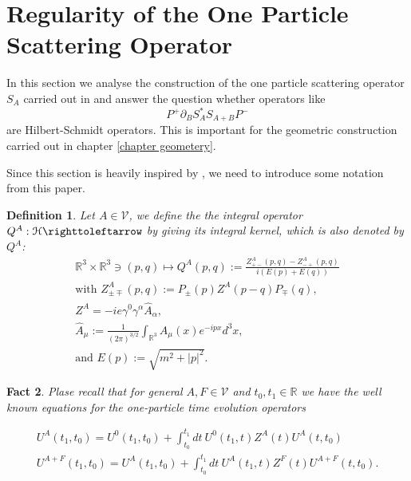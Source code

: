 \documentclass[b5paper,draft,openbib,12pt]{memoir}
\newtheorem{Def}{Definition}
\newtheorem{fact}[Def]{Fact}
\begin{document}
\section{Regularity of the One Particle Scattering Operator}\label{chap:regularity of S}
In this section we analyse the construction of the one particle 
scattering operator \(S_A\)
carried out in \cite{ivp0} and answer the question whether
operators like
\begin{equation}
P^+ \partial_B S_{A}^* S_{A+B}P^-
\end{equation}
are Hilbert-Schmidt operators. This is important 
for the geometric construction carried out in 
chapter \ref{chapter geometery}. 

Since this section is heavily inspired by \cite{ivp0}, we need
to introduce some notation from this paper. 
\begin{Def}
Let \(A\in\mathcal{V}\), we define the the integral operator
\(Q^A:\mathcal{H}\righttoleftarrow\) by giving its integral kernel, which 
is also denoted by \(Q^A\):
\begin{align}
\mathbb{R}^3\times\mathbb{R}^3\ni (p,q)\mapsto Q^A(p,q)
:=\frac{Z^A_{+-}(p,q)-Z^A_{-+}(p,q)}{i(E(p)+E(q))}\\
\text{with }Z^A_{\pm\mp}(p,q):=P_\pm (p)Z^A(p-q)P_\mp (q),\\
Z^A=-i e\gamma^0 \gamma^\alpha \hat{A}_\alpha,\\
\hat{A}_\mu := \frac{1}{(2\pi)^{3/2}}\int_{\mathbb{R}^3} A_\mu (x)e^{-i p x} d^3x,\\ 
\text{and } E(p):=\sqrt{m^2+|p|^2}.
\end{align}

\end{Def}



\begin{fact}
Plase recall that for general \(A,F\in\mathcal{V}\) 
and \(t_0,t_1\in\mathbb{R}\) 
we have the well known equations for
the one-particle time evolution operators

\begin{align}
U^A(t_1,t_0)=U^0(t_1,t_0) + \int_{t_0}^{t_1}dt~ U^0(t_1,t) Z^A(t) U^{A}(t,t_0)\\
U^{A+F}(t_1,t_0)=U^A(t_1,t_0) + \int_{t_0}^{t_1}dt ~U^A(t_1,t) Z^F(t) U^{A+F}(t,t_0).
\end{align}
\end{fact}
\end{document}
